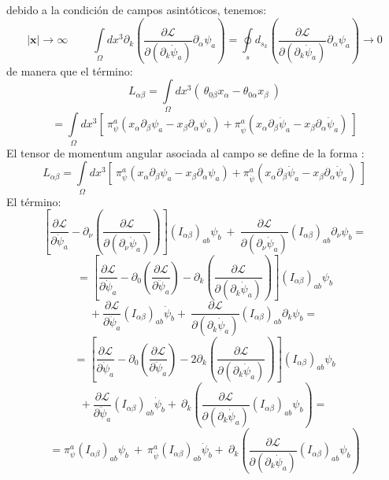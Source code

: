 \documentclass[a4paper,12pt]{article}
\begin{document}
debido a la condición de campos asintóticos, tenemos:
\begin{equation}
|\textbf{x}|\rightarrow\infty\ \ \ \ \ \ \ \ \ \ \int\limits_{\Omega}dx^{3}\partial_k\left(\frac{\partial\mathscr{L} }{\partial(\partial_{k}\dot \psi_a)}\partial_\alpha\psi_a\right)=\oint\limits_{s}d_{s_k}\left(\frac{\partial\mathscr{L} }{\partial(\partial_{k}\dot \psi_a)}\partial_\alpha\psi_a\right)\rightarrow0 
\end{equation}
de manera que el término:
\begin{equation}
L_{\alpha\beta}=\int\limits_{\Omega}dx^{3}(\ \theta_{0\beta} x_\alpha-\theta_{0\alpha} x_\beta  \ )
\label{angumo}
\end{equation}
$$=\int\limits_{\Omega}dx^{3}[\ \pi^{a}_{\psi}(x_{\alpha}\partial_{\beta}\psi_a-x_{\beta}\partial_{\alpha}\psi_a)+\pi^{a}_{\dot\psi}(x_{\alpha}\partial_{\beta}\dot\psi_a-x_{\beta}\partial_{\alpha}\dot\psi_a)  \  ]$$
El tensor de momentum angular asociada al campo se define de la forma \cite{greiner}:
\begin{equation}
L_{\alpha\beta}=\int\limits_{\Omega}dx^{3}[\ \pi^{a}_{\psi}(x_{\alpha}\partial_{\beta}\psi_a-x_{\beta}\partial_{\alpha}\psi_a)+\pi^{a}_{\dot\psi}(x_{\alpha}\partial_{\beta}\dot\psi_a-x_{\beta}\partial_{\alpha}\dot\psi_a)  \ ]
\label{orbitalm}
\end{equation}
El término:
\begin{equation}
\left[\frac{\partial \mathscr{L} }{\partial\dot \psi_a}-\partial_{\nu}\left(\frac{\partial\mathscr{L} }{\partial(\partial_{\nu}\dot \psi_a)}  \right) \right](I_{\alpha\beta})_{ab}\psi_{b}\ +\ \frac{\partial\mathscr{L} }{\partial(\partial_{\nu} \dot\psi_a)}(I_{\alpha\beta})_{ab}\partial_\nu\psi_{b}=
\end{equation}
\begin{equation}
=\left[\frac{\partial \mathscr{L} }{\partial\dot \psi_a}-\partial_{0}\left(\frac{\partial\mathscr{L} }{\partial\ddot \psi_a}\right)-\partial_{k}\left(\frac{\partial\mathscr{L} }{\partial(\partial_k\dot \psi_a)} \right) \right](I_{\alpha\beta})_{ab}\psi_{b}
\end{equation}
$$ +\ \frac{\partial\mathscr{L} }{\partial \ddot\psi_a}(I_{\alpha\beta})_{ab}\dot\psi_b+\ \frac{\partial\mathscr{L} }{\partial (\partial_k\dot\psi_a)}(I_{\alpha\beta})_{ab}\partial_k\psi_b= $$
\begin{equation}
=\left[\frac{\partial \mathscr{L} }{\partial\dot \psi_a}-\partial_{0}\left(\frac{\partial\mathscr{L} }{\partial\ddot \psi_a}\right)-2\partial_{k}\left(\frac{\partial\mathscr{L} }{\partial(\partial_k\dot \psi_a)} \right) \right](I_{\alpha\beta})_{ab}\psi_{b}
\end{equation}
$$+\ \frac{\partial\mathscr{L} }{\partial \ddot\psi_a}(I_{\alpha\beta})_{ab}\dot\psi_b+\ \partial_k\left(\frac{\partial\mathscr{L} }{\partial (\partial_k\dot\psi_a)}(I_{\alpha\beta})_{ab}\psi_b\right)= $$
\begin{equation}
=\pi^{a}_{\psi}(I_{\alpha\beta})_{ab}\psi_{b}\ +\ \pi^{a}_{\dot\psi}(I_{\alpha\beta})_{ab}\dot\psi_b+\ \partial_k\left(\frac{\partial\mathscr{L} }{\partial (\partial_k\dot\psi_a)}(I_{\alpha\beta})_{ab}\psi_b\right) 
\end{equation}
\vspace{0,1cm}
\end{document}
